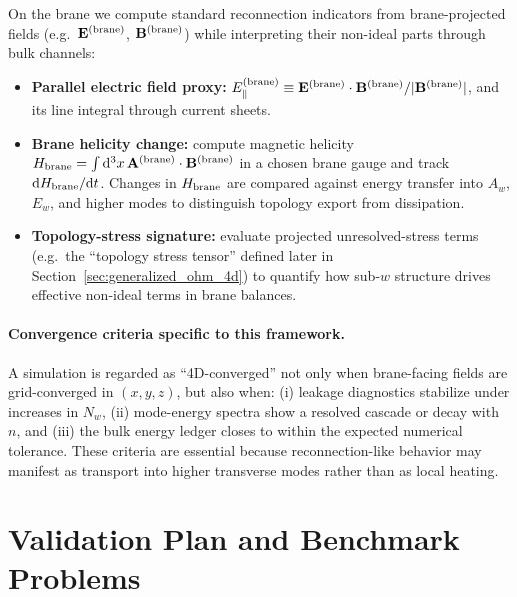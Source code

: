 \documentclass[11pt]{article}
\begin{document}
On the brane we compute standard reconnection indicators from brane-projected fields
(e.g.\ \(\mathbf{E}^{\rm (brane)}\), \(\mathbf{B}^{\rm (brane)}\)) while interpreting
their non-ideal parts through bulk channels:
\begin{itemize}[leftmargin=1.7em]
\item \textbf{Parallel electric field proxy:}
\(
E_{\parallel}^{\rm (brane)} \equiv
\mathbf{E}^{\rm (brane)}\cdot \mathbf{B}^{\rm (brane)} / |\mathbf{B}^{\rm (brane)}|
\),
and its line integral through current sheets.
\item \textbf{Brane helicity change:} compute magnetic helicity
\(H_{\rm brane}=\int \dd^3x\,\mathbf{A}^{\rm (brane)}\cdot\mathbf{B}^{\rm (brane)}\)
in a chosen brane gauge and track \(\dd H_{\rm brane}/\dd t\). Changes in
\(H_{\rm brane}\) are compared against energy transfer into \(A_w\), \(E_w\), and
higher modes to distinguish topology export from dissipation.
\item \textbf{Topology-stress signature:} evaluate projected unresolved-stress terms
(e.g.\ the ``topology stress tensor'' defined later in Section~\ref{sec:generalized_ohm_4d})
to quantify how sub-\(w\) structure drives effective non-ideal terms in brane balances.
\end{itemize}

\paragraph{Convergence criteria specific to this framework.}
A simulation is regarded as ``4D-converged'' not only when brane-facing fields are
grid-converged in \((x,y,z)\), but also when:
(i) leakage diagnostics stabilize under increases in \(N_w\),
(ii) mode-energy spectra show a resolved cascade or decay with \(n\),
and (iii) the bulk energy ledger closes to within the expected numerical tolerance.
These criteria are essential because reconnection-like behavior may manifest as
transport into higher transverse modes rather than as local heating.

\section{Validation Plan and Benchmark Problems}
\label{sec:validation}
\end{document}

